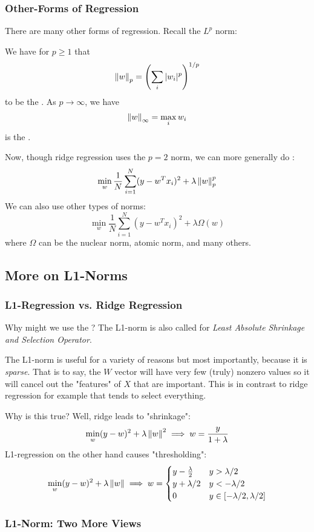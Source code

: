 \documentclass[11pt]{scrartcl}
\begin{document}
\subsubsection{Other-Forms of Regression}
There are many other forms of regression. Recall the $L^p$ norm:
\begin{defn}
We have for $p \ge 1$ that $$\left\lVert w\right\rVert_{p}=\left(\sum_{i}|w_{i}|^{p}\right)^{1/p}$$
to be the . As $p \to \infty$, we have $$\left\lVert w\right\rVert_{\infty}=\max_{i} {w_i}$$
is the .
\end{defn}
Now, though ridge regression uses the $p=2$ norm, we can more generally do :
$$\min_{w}\frac{1}{N}\sum_{i=1}^{N}(y-w^{T}x_i)^2+\lambda\left\lVert w\right\rVert_p^{p}$$
We can also use other types of norms:
$$\min_{w}\frac{1}{N}\sum_{i=1}^{N}(y-w^{T}x_i)^2+\lambda\Omega(w)$$
where $\Omega$ can be the nuclear norm, atomic norm, and many others. 

\subsection{More on L1-Norms}
\subsubsection{L1-Regression vs. Ridge Regression}
Why might we use the ? The L1-norm is also called  for \textit{Least Absolute Shrinkage and Selection Operator}. 

The L1-norm is useful for a variety of reasons but most importantly, because it is \textit{sparse}. That is to say, the $W$ vector will have very few (truly) nonzero values so it will cancel out the "features" of $X$ that are important. This is in contrast to ridge regression for example that tends to select everything. 

Why is this true? Well, ridge leads to "shrinkage":
$$\min_{w} (y-w)^2+\lambda\left\lVert w\right\rVert^2 \implies w=\frac{y}{1+\lambda}$$
L1-regression on the other hand causes "thresholding": 
$$\min_{w}(y-w)^2+\lambda\left\lVert w\right\rVert \implies w=\begin{cases} y-\frac{\lambda}{2}  & y>\lambda/2 \\ y+\lambda/2 & y< -\lambda/2 \\ 0 & y \in [-\lambda/2, \lambda/2]\end{cases}$$

\subsubsection{L1-Norm: Two More Views}
\end{document}
